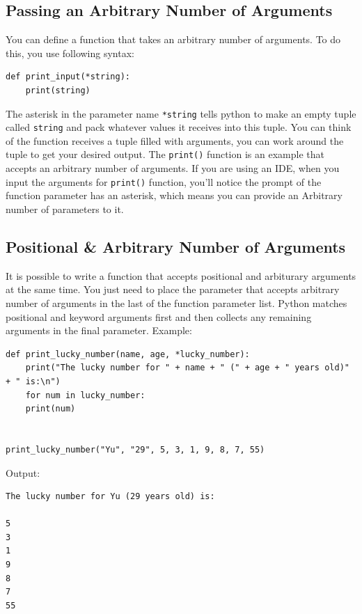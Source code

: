 \documentclass[12pt]{book}
\begin{document}
\subsection{Passing an Arbitrary Number of Arguments}
\label{sec:orgb4d1ffd}
You can define a function that takes an arbitrary number of arguments. To do this, you use following syntax:
\begin{verbatim}
def print_input(*string):
    print(string)
\end{verbatim}
The asterisk in the parameter name \texttt{*string} tells python to make an empty tuple called \texttt{string} and pack whatever values it receives into this tuple. You can think of the function receives a tuple filled with arguments, you can work around the tuple to get your desired output. The \texttt{print()} function is an example that accepts an arbitrary number of arguments. If you are using an IDE, when you input the arguments for \texttt{print()} function, you'll notice the prompt of the function parameter has an asterisk, which means you can provide an Arbitrary number of parameters to it.

\subsection{Positional \& Arbitrary Number of Arguments}
\label{sec:org4ae9fac}
It is possible to write a function that accepts positional and arbiturary arguments at the same time. You just need to place the parameter that accepts arbitrary number of arguments in the last of the function parameter list. Python matches positional and keyword arguments first and then collects any remaining arguments in the final parameter. Example:
\begin{verbatim}
def print_lucky_number(name, age, *lucky_number):
    print("The lucky number for " + name + " (" + age + " years old)" + " is:\n")
    for num in lucky_number:
	print(num)


print_lucky_number("Yu", "29", 5, 3, 1, 9, 8, 7, 55)
\end{verbatim}
Output:
\begin{verbatim}
The lucky number for Yu (29 years old) is:

5
3
1
9
8
7
55
\end{verbatim}
\end{document}
